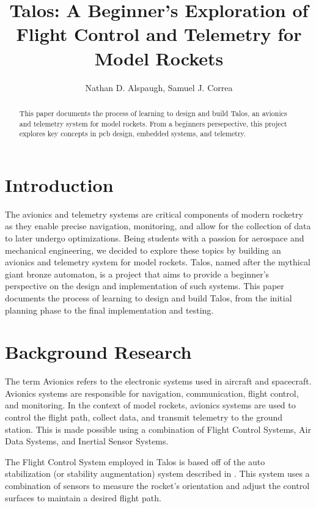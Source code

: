 \documentclass{article}
\title{Talos: A Beginner's Exploration of Flight Control and Telemetry for Model Rockets}
\author{Nathan D. Alspaugh, Samuel J. Correa}
\begin{document}
\maketitle

\begin{abstract}
      This paper documents the process of learning to design and build Talos, an avionics and telemetry system for model rockets. From a beginners persepective, this project explores key concepts in pcb design, embedded systems, and telemetry.
\end{abstract}

\section{Introduction}

The avionics and telemetry systems are critical components of modern rocketry as they enable precise navigation, monitoring, and allow for the collection of data to later undergo optimizations. Being students with a passion for aerospace and mechanical engineering, we decided to explore these topics by building an avionics and telemetry system for model rockets. Talos, named after the mythical giant bronze automaton, is a project that aims to provide a beginner's perspective on the design and implementation of such systems. This paper documents the process of learning to design and build Talos, from the initial planning phase to the final implementation and testing.

\section{Background Research}

The term Avionics refers to the electronic systems used in aircraft and spacecraft. Avionics systems are responsible for navigation, communication, flight control, and monitoring. In the context of model rockets, avionics systems are used to control the flight path, collect data, and transmit telemetry to the ground station. This is made possible using a combination of Flight Control Systems, Air Data Systems, and Inertial Sensor Systems.


The Flight Control System employed in Talos is based off of the auto stabilization (or stability augmentation) system described in \cite{Collinson_2012}. This system uses a combination of sensors to measure the rocket's orientation and adjust the control surfaces to maintain a desired flight path.
\end{document}
